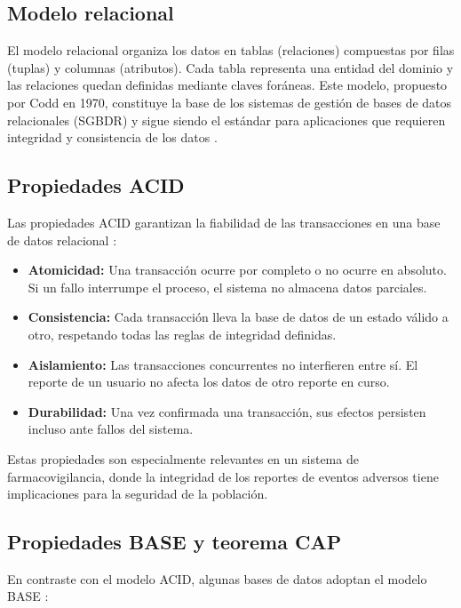 \subsection{Modelo relacional}

El modelo relacional organiza los datos en tablas (relaciones) compuestas por filas (tuplas) y columnas (atributos). Cada tabla representa una entidad del dominio y las relaciones quedan definidas mediante claves foráneas.
Este modelo, propuesto por Codd en 1970, constituye la base de los sistemas de gestión de bases de datos relacionales (SGBDR) y sigue siendo el estándar para aplicaciones que requieren integridad y consistencia de los datos \cite{codd1970}.

\subsection{Propiedades ACID}

Las propiedades ACID garantizan la fiabilidad de las transacciones en una base de datos relacional \cite{ibm_acid_properties}:

\begin{itemize}
	\item \textbf{Atomicidad:} Una transacción ocurre por completo o no ocurre en absoluto. Si un fallo interrumpe el proceso, el sistema no almacena datos parciales.
    \item \textbf{Consistencia:} Cada transacción lleva la base de datos de un estado válido a otro, respetando todas las reglas de integridad definidas.
    \item \textbf{Aislamiento:} Las transacciones concurrentes no interfieren entre sí. El reporte de un usuario no afecta los datos de otro reporte en curso.
    \item \textbf{Durabilidad:} Una vez confirmada una transacción, sus efectos persisten incluso ante fallos del sistema.
\end{itemize}

Estas propiedades son especialmente relevantes en un sistema de farmacovigilancia, donde la integridad de los reportes de eventos adversos tiene implicaciones para la seguridad de la población.

\subsection{Propiedades BASE y teorema CAP}

En contraste con el modelo ACID, algunas bases de datos adoptan el modelo BASE \cite{moniruzzaman2013nosql}:


